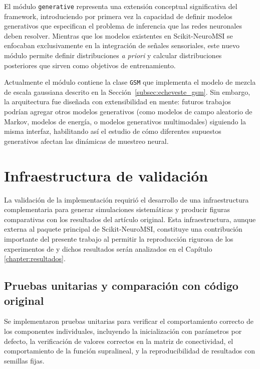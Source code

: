 El módulo \texttt{generative} representa una extensión conceptual significativa del framework, introduciendo por primera vez la capacidad de definir modelos generativos que especifican el problema de inferencia que las redes neuronales deben resolver. Mientras que los modelos existentes en Scikit-NeuroMSI se enfocaban exclusivamente en la integración de señales sensoriales, este nuevo módulo permite definir distribuciones \textit{a priori} y calcular distribuciones posteriores que sirven como objetivos de entrenamiento.

Actualmente el módulo contiene la clase \texttt{GSM} que implementa el modelo de mezcla de escala gaussiana descrito en la Sección~\ref{subsec:echeveste_gsm}. Sin embargo, la arquitectura fue diseñada con extensibilidad en mente: futuros trabajos podrían agregar otros modelos generativos (como modelos de campo aleatorio de Markov, modelos de energía, o modelos generativos multimodales) siguiendo la misma interfaz, habilitando así el estudio de cómo diferentes supuestos generativos afectan las dinámicas de muestreo neural.


\section{Infraestructura de validación}
\label{sec:impl_infraestructura}

La validación de la implementación requirió el desarrollo de una infraestructura complementaria para generar simulaciones sistemáticas y producir figuras comparativas con los resultados del artículo original. Esta infraestructura, aunque externa al paquete principal de Scikit-NeuroMSI, constituye una contribución importante del presente trabajo al permitir la reproducción rigurosa de los experimentos de \citet{echeveste2020cortical} y dichos resultados serán analizados en el Capítulo \ref{chapter:resultados}. 

\subsection{Pruebas unitarias y comparación con código original}
\label{subsec:impl_tests}

Se implementaron pruebas unitarias para verificar el comportamiento correcto de los componentes individuales, incluyendo la inicialización con parámetros por defecto, la verificación de valores correctos en la matriz de conectividad, el comportamiento de la función supralineal, y la reproducibilidad de resultados con semillas fijas.

